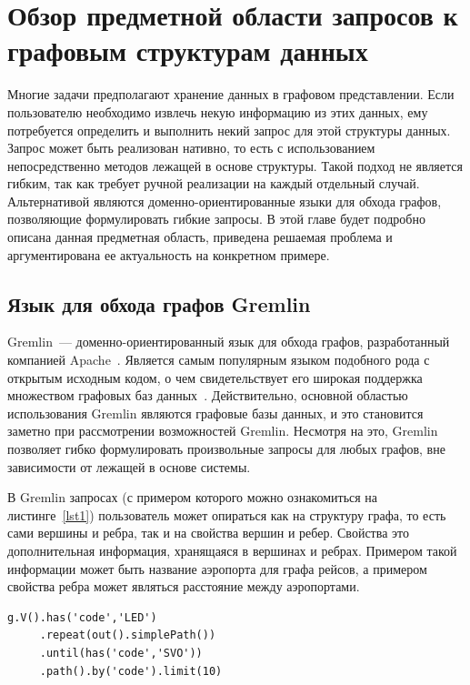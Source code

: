 \documentclass[times,specification,annotation]{itmo-student-thesis}
\begin{document}
\chapter{Обзор предметной области запросов к графовым структурам данных}

\startrelatedwork
Многие задачи предполагают хранение данных в графовом представлении. Если пользователю необходимо извлечь некую информацию из этих данных, ему потребуется определить и выполнить некий запрос для этой структуры данных. Запрос может быть реализован нативно, то есть с использованием непосредственно методов лежащей в основе структуры. Такой подход не является гибким, так как требует ручной реализации на каждый отдельный случай. Альтернативой являются доменно-ориентированные языки для обхода графов, позволяющие формулировать гибкие запросы. В этой главе будет подробно описана данная предметная область, приведена решаемая проблема и аргументирована ее актуальность на конкретном примере.

\section{Язык для обхода графов Gremlin}\label{gremlin}

Gremlin~--- доменно-ориентированный язык для обхода графов, разработанный компанией Apache~\cite{gremlin}. Является самым популярным языком подобного рода с открытым исходным кодом, о чем свидетельствует его широкая поддержка множеством графовых баз данных~\cite{tinkerpop-enabled}. Действительно, основной областью использования Gremlin являются графовые базы данных, и это становится заметно при рассмотрении возможностей Gremlin. Несмотря на это, Gremlin позволяет гибко формулировать произвольные запросы для любых графов, вне зависимости от лежащей в основе системы.

В Gremlin запросах (с примером которого можно ознакомиться на листинге~\ref{lst1}) пользователь может опираться как на структуру графа, то есть сами вершины и ребра, так и на свойства вершин и ребер. Свойства это дополнительная информация, хранящаяся в вершинах и ребрах. Примером такой информации может быть название аэропорта для графа рейсов, а примером свойства ребра может являться расстояние между аэропортами. 

\begin{lstlisting}[float=!h,caption={Пример запроса на Gremlin},label={lst1}]
g.V().has('code','LED')
     .repeat(out().simplePath())
     .until(has('code','SVO'))
     .path().by('code').limit(10)
\end{lstlisting}
\end{document}
